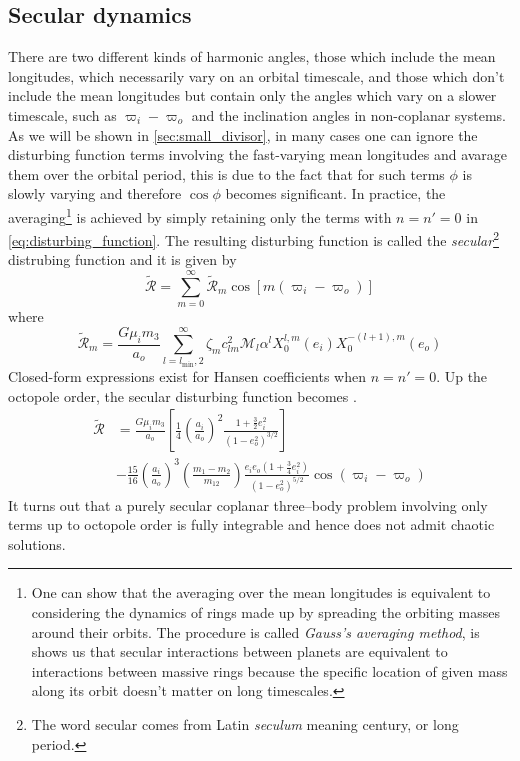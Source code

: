 \documentclass[ twoside,openright,titlepage,numbers=noenddot,headinclude,%
                footinclude=true,cleardoublepage=empty,abstractoff, %
                BCOR=5mm,paper=a4,fontsize=11pt,%
                american,%
                ]{scrreprt}
\begin{document}
\subsection{Secular dynamics}
\label{sub:secular_dynamics}
There are two different kinds of harmonic angles, those which 
include the mean longitudes, which necessarily vary on an orbital
timescale, and those which don't include the mean longitudes but
contain only the angles which vary on a slower timescale, such 
as $\varpi_i-\varpi_o$ and the inclination angles in non-coplanar
systems. As we will be shown in \cref{sec:small_divisor}, in many
cases one can ignore the disturbing function terms involving the 
fast-varying mean longitudes and avarage them over the orbital
period, this is due to the fact that for such terms $\phi$ is 
slowly varying and therefore $\cos{\phi}$ becomes significant.
 In practice, the averaging\footnote{One can show \citep{murray}
that the averaging over the mean longitudes is equivalent to 
considering the dynamics of rings made up by spreading the 
orbiting masses
around their orbits. The procedure is called \emph{Gauss's 
averaging method}, is shows us that secular interactions
between planets are equivalent to interactions between massive
rings because the specific location of given mass along its orbit
doesn't matter on long timescales.} 
is achieved by simply retaining only
the terms with $n=n'=0$ in \cref{eq:disturbing_function}. The 
resulting disturbing function is called the 
\emph{secular}\footnote{The word secular comes from Latin 
\emph{seculum} meaning
century, or long period.} distrubing function and it is given by
\begin{equation}
    \tilde{\mathcal{R}}=\sum^\infty_{m=0}\tilde{\mathcal{R}}_m
    \cos[m(\varpi_i-\varpi_o)]
    \label{eq:secular_dist}
\end{equation}
where
\begin{equation}
    \tilde{\mathcal{R}}_m= \frac{G\mu_im_3}{a_o}
    \sum^\infty_{l=l_\text{min},2}\zeta_mc_{lm}^2\mathcal{M}_l
    \alpha^l X_0^{l,m}(e_i)X_0^{-(l+1),m}(e_o)
\end{equation}
Closed-form expressions exist for Hansen coefficients when $n=n'=0$.
Up the octopole order, the secular disturbing function becomes
\citep{Mardling2013}.
\begin{equation}
\begin{aligned}
    \tilde{\mathcal{R}}&= \frac{G\mu_im_3}{a_o}\left[ \frac{1}{4} 
    \left( \frac{a_i}{a_o} \right)^2 
    \frac{1+ \frac{3}{2} e_i^2}{(1-e_o^2)^{3/2}}\right]\\  
    &-\frac{15}{16}
    \left( \frac{a_i}{a_o} \right)^3\left( \frac{m_1-m_2}{m_{12}}
    \right) \frac{e_ie_o(1+ \frac{3}{4} e_i^2)}{(1-e_o^2)^{5/2}} 
    \cos(\varpi_i-\varpi_o)
\end{aligned}
    \label{eq:dist_sec_octopole}
\end{equation}
It turns out that a purely secular coplanar three--body problem 
involving only terms
up to octopole order is fully integrable \citep[ex.][]{murray}
and hence does not admit chaotic solutions. 
\end{document}
